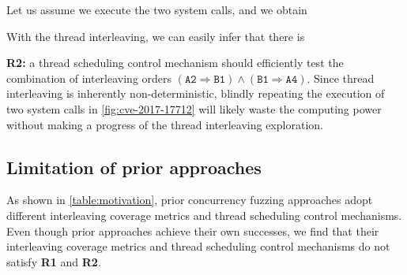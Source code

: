 %
%
Let us assume we execute the two system calls, and we obtain 


%
With the thread interleaving, we can easily infer that there is 


\textbf{R2:} a thread scheduling control mechanism should efficiently test the combination of interleaving orders
$(\texttt{A2} \Rightarrow \texttt{B1}) \wedge (\texttt{B1} \Rightarrow
\texttt{A4})$.
%
Since thread interleaving is inherently non-deterministic, blindly
repeating the execution of two system calls in
\autoref{fig:cve-2017-17712} will likely waste the computing power
without making a progress of the thread interleaving exploration.





%


\subsection{Limitation of prior approaches}
\label{ss:existingapproaches}

\begin{table}[t]
  \centering
  
  \caption{Recent fuzzing works to discover concurrency bugs in the
    kernel, and their interleaving coverage metrics (\textbf{R1}) and
    thread scheduling control mechanisms (\textbf{R2}). ``--''
    indicates that a fuzzer does not adopt a concurrency coverage
    metric.
    }
  \label{table:motivation}
\end{table}

As shown in \autoref{table:motivation}, prior concurrency fuzzing
approaches adopt different interleaving coverage metrics and thread
scheduling control mechanisms.
%
Even though prior approaches achieve their own successes, we find that
their interleaving coverage metrics and thread scheduling control
mechanisms do not satisfy \textbf{R1} and \textbf{R2}.


